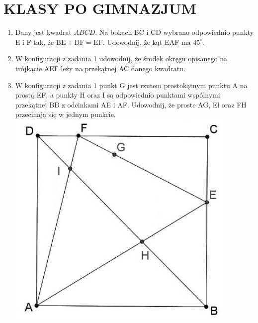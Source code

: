 \documentclass[10pt]{article}
\begin{document}
\section*{KLASY PO GIMNAZJUM}
\begin{enumerate}
  \item Dany jest kwadrat \(A B C D\). Na bokach BC i CD wybrano odpowiednio punkty E i F tak, że \(\mathrm{BE}+\mathrm{DF}=\mathrm{EF}\). Udowodnij, że kąt EAF ma \(45^{\circ}\).
  \item W konfiguracji z zadania 1 udowodnij, że środek okręgu opisanego na trójkącie AEF leży na przekątnej AC danego kwadratu.
  \item W konfiguracji z zadania 1 punkt G jest rzutem prostokątnym punktu A na prostą EF, a punkty H oraz I są odpowiednio punktami wspólnymi przekątnej BD z odcinkami AE i AF. Udowodnij, że proste AG, El oraz FH przecinają się w jednym punkcie.\\
\includegraphics[max width=\textwidth, center]{2024_11_21_4f01d8a613fbbdc215e5g-1(1)}
\end{enumerate}
\end{document}
